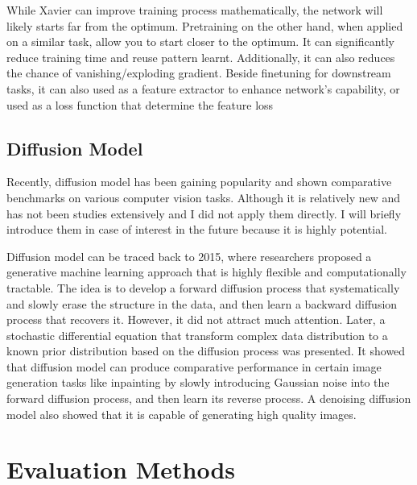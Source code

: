 While Xavier can improve training process mathematically, the network will likely starts far from the optimum. Pretraining on the other hand, when applied on a similar task, allow you to start closer to the optimum. It can significantly reduce training time and reuse pattern learnt. Additionally, it can also reduces the chance of vanishing/exploding gradient. Beside finetuning for downstream tasks, it can also used as a feature extractor to enhance network's capability, or used as a loss function that determine the feature loss



\subsection{Diffusion Model}
Recently, diffusion model has been gaining popularity and shown comparative benchmarks on various computer vision tasks\cite{sahariaPaletteImagetoImageDiffusion2022, dhariwalDiffusionModelsBeat2021}. Although it is relatively new and has not been studies extensively and I did not apply them directly. I will briefly introduce them in case of interest in the future because it is highly potential.

Diffusion model can be traced back to 2015, where researchers proposed a generative machine learning approach that is highly flexible and computationally tractable\cite{sohl-dicksteinDeepUnsupervisedLearning2015}. The idea is to develop a forward diffusion process that systematically and slowly erase the structure in the data, and then learn a backward diffusion process that recovers it. However, it did not attract much attention. Later, a stochastic differential equation that transform complex data distribution to a known prior distribution based on the diffusion process was presented\cite{songScoreBasedGenerativeModeling2021}. It showed that diffusion model can produce comparative performance in certain image generation tasks like inpainting by slowly introducing Gaussian noise into the forward diffusion process, and then learn its reverse process. A denoising diffusion model\cite{hoDenoisingDiffusionProbabilistic2020} also showed that it is capable of generating high quality images.



\section{Evaluation Methods}


